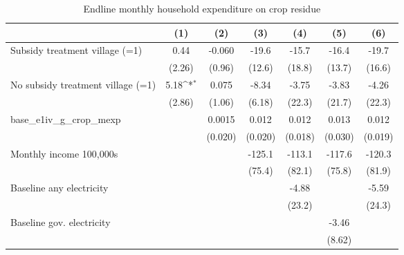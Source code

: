 \begin{table}[htbp]\centering
\def\sym#1{\ifmmode^{#1}\else\(^{#1}\)\fi}
\caption{Endline monthly household expenditure on crop residue}
\begin{tabular*}{1\hsize}{@{\hskip\tabcolsep\extracolsep\fill}l*{6}{c}}
\toprule
                &\multicolumn{1}{c}{(1)}         &\multicolumn{1}{c}{(2)}         &\multicolumn{1}{c}{(3)}         &\multicolumn{1}{c}{(4)}         &\multicolumn{1}{c}{(5)}         &\multicolumn{1}{c}{(6)}         \\
\midrule
Subsidy treatment village (=1)&     0.44         &   -0.060         &    -19.6         &    -15.7         &    -16.4         &    -19.7         \\
                &   (2.26)         &   (0.96)         &   (12.6)         &   (18.8)         &   (13.7)         &   (16.6)         \\
No subsidy treatment village (=1)&     5.18\sym{*}  &    0.075         &    -8.34         &    -3.75         &    -3.83         &    -4.26         \\
                &   (2.86)         &   (1.06)         &   (6.18)         &   (22.3)         &   (21.7)         &   (22.3)         \\
base\_e1iv\_g\_crop\_mexp&                  &   0.0015         &    0.012         &    0.012         &    0.013         &    0.012         \\
                &                  &  (0.020)         &  (0.020)         &  (0.018)         &  (0.030)         &  (0.019)         \\
Monthly income 100,000s&                  &                  &   -125.1         &   -113.1         &   -117.6         &   -120.3         \\
                &                  &                  &   (75.4)         &   (82.1)         &   (75.8)         &   (81.9)         \\
Baseline any electricity&                  &                  &                  &    -4.88         &                  &    -5.59         \\
                &                  &                  &                  &   (23.2)         &                  &   (24.3)         \\
Baseline gov. electricity&                  &                  &                  &                  &    -3.46         &                  \\
                &                  &                  &                  &                  &   (8.62)         &                  \\

\end{tabular*}
\end{table}
